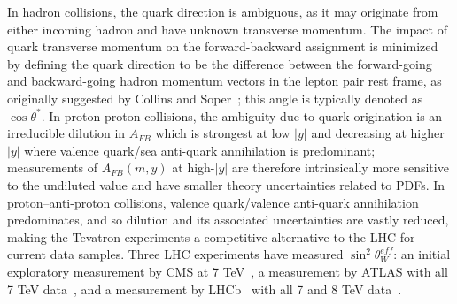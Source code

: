 In hadron collisions, the quark direction is ambiguous, as it may
originate from either incoming hadron and have unknown transverse
momentum. The impact of quark transverse momentum on the
forward-backward assignment is minimized by defining the quark
direction to be the difference between the forward-going and
backward-going hadron momentum vectors in the lepton pair rest frame,
as originally suggested by Collins and Soper~\cite{Collins:1977iv};
this angle is typically denoted as $\cos\theta^*$. In proton-proton
collisions, the ambiguity due to quark origination is an irreducible
dilution in $A_{FB}$ which is strongest at low $|y|$ and decreasing at
higher $|y|$ where valence quark/sea anti-quark annihilation is
predominant; measurements of $A_{FB}(m,y)$ at high-$|y|$ are therefore
intrinsically more sensitive to the undiluted value and have smaller
theory uncertainties related to PDFs.  In proton--anti-proton
collisions, valence quark/valence anti-quark annihilation
predominates, and so dilution and its associated uncertainties are
vastly reduced, making the Tevatron experiments a competitive
alternative to the LHC for current data samples. Three LHC experiments
have measured $\sin^2\theta^{eff}_{W}$: an initial exploratory
measurement by CMS at 7 TeV~\cite{Chatrchyan:2011ya}, a measurement by
ATLAS with all 7 TeV data~\cite{Aad:2015uau}, and a measurement by
LHCb~\cite{Alves:2008zz,Aaij:2014jba} with all 7 and 8 TeV
data~\cite{Aaij:2015lka}.

